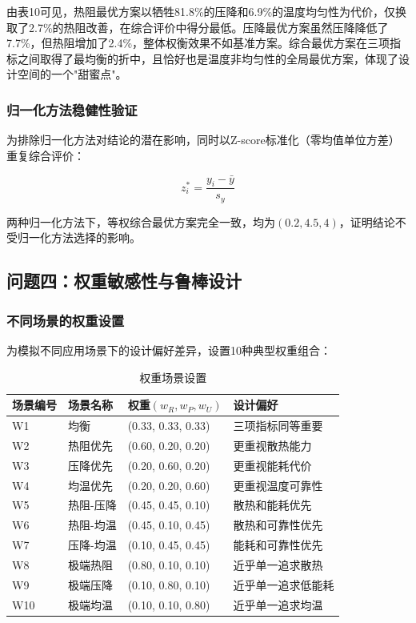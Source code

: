 \documentclass[12pt,a4paper]{ctexart}
\begin{document}
\smallskip
{}

由表10可见，热阻最优方案以牺牲81.8\%的压降和6.9\%的温度均匀性为代价，仅换取了2.7\%的热阻改善，在综合评价中得分最低。压降最优方案虽然压降降低了7.7\%，但热阻增加了2.4\%，整体权衡效果不如基准方案。综合最优方案在三项指标之间取得了最均衡的折中，且恰好也是温度非均匀性的全局最优方案，体现了设计空间的一个"甜蜜点"。

\subsubsection{归一化方法稳健性验证}

为排除归一化方法对结论的潜在影响，同时以Z-score标准化（零均值单位方差）重复综合评价：

\begin{equation}
z_i^* = \frac{y_i - \bar{y}}{s_y}
\end{equation}

两种归一化方法下，等权综合最优方案完全一致，均为$(0.2, 4.5, 4)$，证明结论不受归一化方法选择的影响。

\subsection{问题四：权重敏感性与鲁棒设计}

\subsubsection{不同场景的权重设置}

为模拟不同应用场景下的设计偏好差异，设置10种典型权重组合：

\begin{table}[H]
\centering
\caption{权重场景设置}
\footnotesize
\begin{tabular}{p{}p{}p{}p{}}
\toprule
场景编号 & 场景名称 & 权重$(w_R,w_P,w_U)$ & 设计偏好 \\
\midrule
W1 & 均衡 & (0.33, 0.33, 0.33) & 三项指标同等重要 \\
W2 & 热阻优先 & (0.60, 0.20, 0.20) & 更重视散热能力 \\
W3 & 压降优先 & (0.20, 0.60, 0.20) & 更重视能耗代价 \\
W4 & 均温优先 & (0.20, 0.20, 0.60) & 更重视温度可靠性 \\
W5 & 热阻-压降 & (0.45, 0.45, 0.10) & 散热和能耗优先 \\
W6 & 热阻-均温 & (0.45, 0.10, 0.45) & 散热和可靠性优先 \\
W7 & 压降-均温 & (0.10, 0.45, 0.45) & 能耗和可靠性优先 \\
W8 & 极端热阻 & (0.80, 0.10, 0.10) & 近乎单一追求散热 \\
W9 & 极端压降 & (0.10, 0.80, 0.10) & 近乎单一追求低能耗 \\
W10 & 极端均温 & (0.10, 0.10, 0.80) & 近乎单一追求均温 \\
\bottomrule
\end{tabular}
\end{table}
\end{document}

